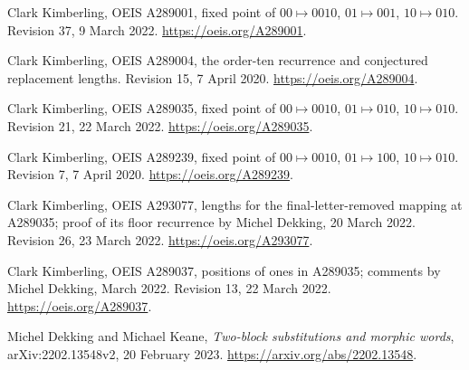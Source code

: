 Clark Kimberling, OEIS A289001, fixed point of
$00\mapsto0010$, $01\mapsto001$, $10\mapsto010$.
Revision 37, 9 March 2022.
\url{https://oeis.org/A289001}.

Clark Kimberling, OEIS A289004, the order-ten recurrence and
conjectured replacement lengths.
Revision 15, 7 April 2020.
\url{https://oeis.org/A289004}.

Clark Kimberling, OEIS A289035, fixed point of
$00\mapsto0010$, $01\mapsto010$, $10\mapsto010$.
Revision 21, 22 March 2022.
\url{https://oeis.org/A289035}.

Clark Kimberling, OEIS A289239, fixed point of
$00\mapsto0010$, $01\mapsto100$, $10\mapsto010$.
Revision 7, 7 April 2020.
\url{https://oeis.org/A289239}.

Clark Kimberling, OEIS A293077, lengths for the final-letter-removed
mapping at A289035; proof of its floor recurrence by Michel Dekking,
20 March 2022. Revision 26, 23 March 2022.
\url{https://oeis.org/A293077}.

Clark Kimberling, OEIS A289037, positions of ones in A289035;
comments by Michel Dekking, March 2022.
Revision 13, 22 March 2022.
\url{https://oeis.org/A289037}.

Michel Dekking and Michael Keane,
\emph{Two-block substitutions and morphic words},
arXiv:2202.13548v2, 20 February 2023.
\url{https://arxiv.org/abs/2202.13548}.
